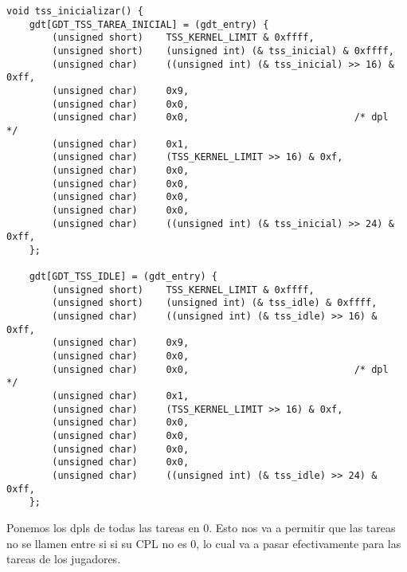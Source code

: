 \begin{codesnippet}
\begin{verbatim}
void tss_inicializar() {
    gdt[GDT_TSS_TAREA_INICIAL] = (gdt_entry) {
        (unsigned short)    TSS_KERNEL_LIMIT & 0xffff,                          
        (unsigned short)    (unsigned int) (& tss_inicial) & 0xffff,            
        (unsigned char)     ((unsigned int) (& tss_inicial) >> 16) & 0xff,      
        (unsigned char)     0x9,                                                
        (unsigned char)     0x0,                                                
        (unsigned char)     0x0,                             /* dpl          */
        (unsigned char)     0x1,                                                
        (unsigned char)     (TSS_KERNEL_LIMIT >> 16) & 0xf,                     
        (unsigned char)     0x0,                                                
        (unsigned char)     0x0,                                                
        (unsigned char)     0x0,                                                
        (unsigned char)     0x0,                                                
        (unsigned char)     ((unsigned int) (& tss_inicial) >> 24) & 0xff,      
    };

    gdt[GDT_TSS_IDLE] = (gdt_entry) {
        (unsigned short)    TSS_KERNEL_LIMIT & 0xffff,                          
        (unsigned short)    (unsigned int) (& tss_idle) & 0xffff,               
        (unsigned char)     ((unsigned int) (& tss_idle) >> 16) & 0xff,         
        (unsigned char)     0x9,                                                
        (unsigned char)     0x0,                                                
        (unsigned char)     0x0,                             /* dpl          */
        (unsigned char)     0x1,                                                
        (unsigned char)     (TSS_KERNEL_LIMIT >> 16) & 0xf,                     
        (unsigned char)     0x0,                                                
        (unsigned char)     0x0,                                                
        (unsigned char)     0x0,                                                
        (unsigned char)     0x0,                                                
        (unsigned char)     ((unsigned int) (& tss_idle) >> 24) & 0xff,         
    };

\end{verbatim}
\end{codesnippet}
Ponemos los dpls de todas las tareas en 0. Esto nos va a permitir que las tareas no se llamen entre si si su CPL no es 0, lo cual va a pasar efectivamente para las tareas de los jugadores.
